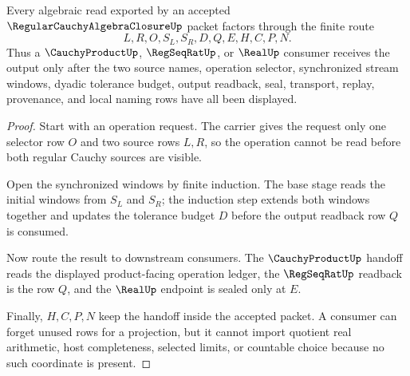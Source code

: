 \begin{theorem}
\label{thm:regular-cauchy-algebra-closure-operation-handoff}
Every algebraic read exported by an accepted $\RegularCauchyAlgebraClosureUp$ packet factors through the finite route
$$
L,R,O,S_L,S_R,D,Q,E,H,C,P,N .
$$
Thus a $\CauchyProductUp$, $\RegSeqRatUp$, or $\RealUp$ consumer receives the output only after the two source names, operation selector, synchronized stream windows, dyadic tolerance budget, output readback, seal, transport, replay, provenance, and local naming rows have all been displayed.
\end{theorem}
\begin{proof}
Start with an operation request. The carrier gives the request only one selector row $O$ and two source rows $L,R$, so the operation cannot be read before both regular Cauchy sources are visible.

Open the synchronized windows by finite induction. The base stage reads the initial windows from $S_L$ and $S_R$; the induction step extends both windows together and updates the tolerance budget $D$ before the output readback row $Q$ is consumed.

Now route the result to downstream consumers. The $\CauchyProductUp$ handoff reads the displayed product-facing operation ledger, the $\RegSeqRatUp$ readback is the row $Q$, and the $\RealUp$ endpoint is sealed only at $E$.

Finally, $H,C,P,N$ keep the handoff inside the accepted packet. A consumer can forget unused rows for a projection, but it cannot import quotient real arithmetic, host completeness, selected limits, or countable choice because no such coordinate is present.
\end{proof}



